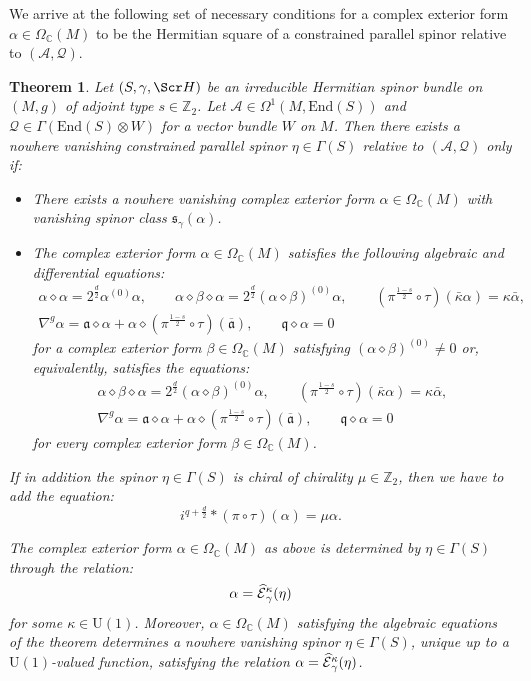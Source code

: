\documentclass[10pt,a4paper,twoside,reqno]{amsart}
\theoremstyle{plain}
\newtheorem{thm}{Theorem}[section]
\theoremstyle{definition}
\theoremstyle{remark}
\newcommand{\End}{\mathrm{End}}
\def\Z{\mathbb{Z}}
\def\C{\mathbb{C}}
\def\cQ{\mathcal{Q}}
\def\fra{\mathfrak{a}}
\def\frq{\mathfrak{q}}
\def\scS{\Scr H}
\def\U{\mathrm{U}}
\def\cA{\mathcal{A}}
\def\hcE{\smash{\widehat{\mathcal{E}}}}
\begin{document}
We arrive at the following set of necessary conditions for a complex exterior form $\alpha\in\Omega_\C(M)$ to be the Hermitian square of a constrained parallel spinor relative to $(\cA,\cQ)$.

\begin{thm}
\label{thm:even_constrained_parallel_spinors}
Let $(S,\gamma,\scS)$ be an irreducible Hermitian spinor bundle on $(M,g)$ of adjoint type $s\in\Z_2$. Let $\cA \in \Omega^1(M,\End(S))$ and $\cQ\in\Gamma(\End(S)\otimes W)$ for a vector bundle $W$ on $M$. Then there exists a nowhere vanishing constrained parallel spinor $\eta\in\Gamma(S)$ relative to $(\cA,\cQ)$ only if: 
\begin{itemize}
\item There exists a nowhere vanishing complex exterior form $\alpha\in\Omega_\C(M)$ with vanishing spinor class $\mathfrak{s}_{\gamma}(\alpha)$.
\item The complex exterior form $\alpha\in\Omega_\C(M)$ satisfies the following algebraic and differential equations: \begin{gather*}
\alpha\diamond\alpha = 2^{\frac{d}{2}}\alpha^{(0)}\alpha,\qquad \alpha \diamond \beta \diamond \alpha=2^{\frac{d}{2}}(\alpha\diamond\beta)^{(0)}\alpha,\qquad(\pi^{\frac{1-s}{2}}\circ\tau)(\bar\kappa\alpha) = \kappa \bar{\alpha},\\
\nabla^g\alpha=\fra\diamond\alpha+\alpha\diamond(\pi^{\frac{1-s}{2}}\circ\tau)(\overline{\fra}),\qquad\frq\diamond\alpha=0
\end{gather*} 
for a complex exterior form $\beta\in\Omega_\C(M)$ satisfying $(\alpha\diamond\beta)^{(0)}\neq0$ or, equivalently, satisfies the equations: 
\begin{gather*}
\alpha \diamond \beta \diamond \alpha=2^{\frac{d}{2}}(\alpha\diamond\beta)^{(0)}\alpha,\qquad(\pi^{\frac{1-s}{2}}\circ\tau)(\bar\kappa\alpha) = \kappa \bar{\alpha},\\
\nabla^g\alpha=\fra\diamond\alpha+\alpha\diamond(\pi^{\frac{1-s}{2}}\circ\tau)(\overline{\fra}),\qquad\frq\diamond\alpha=0
\end{gather*} 
for every complex exterior form $\beta\in\Omega_\C(M)$.
\end{itemize}
    
If in addition the spinor $\eta\in\Gamma(S)$ is chiral of chirality $\mu\in\Z_2$, then we have to add the equation: $$i^{q+\frac{d}{2}}*(\pi\circ\tau)(\alpha)=\mu\alpha.$$

The complex exterior form $\alpha\in\Omega_\C(M)$ as above is determined by $\eta\in\Gamma(S)$ through the relation: $$\alpha=\hcE^\kappa_\gamma(\eta)$$ for some $\kappa\in\U(1)$. Moreover, $\alpha\in\Omega_\C(M)$ satisfying the algebraic equations of the theorem determines a nowhere vanishing spinor $\eta\in\Gamma(S)$, unique up to a $\U(1)$-valued function, satisfying the relation $\alpha=\hcE^\kappa_\gamma(\eta)$.
\end{thm}
\end{document}
